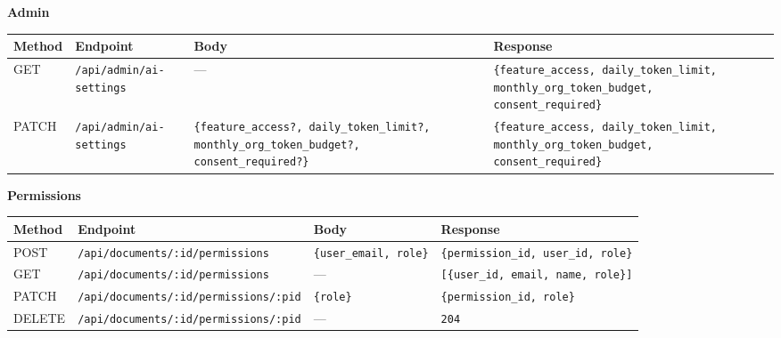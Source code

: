 \documentclass{article}
\begin{document}
\vspace{10pt}
\noindent\textbf{Admin}
\vspace{5pt}

\noindent
{\small
\begin{tabularx}{\textwidth}{|>{\hsize=0.3\hsize\raggedright\arraybackslash}X|>{\hsize=0.6\hsize\raggedright\arraybackslash}X|>{\hsize=0.6\hsize\raggedright\arraybackslash}X|>{\hsize=0.9\hsize\raggedright\arraybackslash}X|}
    \hline
    \rowcolor{tableBlue}
    \textbf{\color{white}Method} &
    \textbf{\color{white}Endpoint} &
    \textbf{\color{white}Body} &
    \textbf{\color{white}Response} \\
    \hline
    GET & \texttt{/api/admin/ai-settings} & — & \texttt{\{feature\_access, daily\_token\_limit, monthly\_org\_token\_budget, consent\_required\}} \\
    \hline
    PATCH & \texttt{/api/admin/ai-settings} & \texttt{\{feature\_access?, daily\_token\_limit?, monthly\_org\_token\_budget?, consent\_required?\}} & \texttt{\{feature\_access, daily\_token\_limit, monthly\_org\_token\_budget, consent\_required\}} \\
    \hline
\end{tabularx}
}

\vspace{10pt}
\noindent\textbf{Permissions}
\vspace{5pt}

\noindent
{\small
\begin{tabularx}{\textwidth}{|>{\hsize=0.3\hsize\raggedright\arraybackslash}X|>{\hsize=0.7\hsize\raggedright\arraybackslash}X|>{\hsize=0.4\hsize\raggedright\arraybackslash}X|>{\hsize=0.6\hsize\raggedright\arraybackslash}X|}
    \hline
    \rowcolor{tableBlue}
    \textbf{\color{white}Method} &
    \textbf{\color{white}Endpoint} &
    \textbf{\color{white}Body} &
    \textbf{\color{white}Response} \\
    \hline
    POST & \texttt{/api/documents/:id/permissions} & \texttt{\{user\_email, role\}} & \texttt{\{permission\_id, user\_id, role\}} \\
    \hline
    GET & \texttt{/api/documents/:id/permissions} & — & \texttt{[\{user\_id, email, name, role\}]} \\
    \hline
    PATCH & \texttt{/api/documents/:id/permissions/:pid} & \texttt{\{role\}} & \texttt{\{permission\_id, role\}} \\
    \hline
    DELETE & \texttt{/api/documents/:id/permissions/:pid} & — & \texttt{204} \\
    \hline
\end{tabularx}
}
\end{document}
